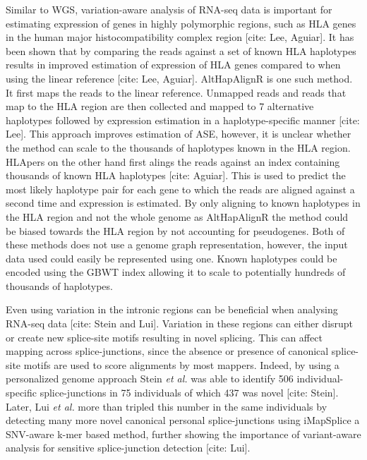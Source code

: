 Similar to WGS, variation-aware analysis of RNA-seq data is important for estimating expression of genes in highly polymorphic regions, such as HLA genes in the human major histocompatibility complex region [cite: Lee, Aguiar]. 
It has been shown that by comparing the reads against a set of known HLA haplotypes results in improved estimation of expression of HLA genes compared to when using the linear reference [cite: Lee, Aguiar].
AltHapAlignR is one such method. It first maps the reads to the linear reference. Unmapped reads and reads that map to the HLA region are then collected and mapped to 7 alternative haplotypes followed by expression estimation in a haplotype-specific manner [cite: Lee]. 
This approach improves estimation of ASE, however, it is unclear whether the method can scale to the thousands of haplotypes known in the HLA region.
HLApers on the other hand first alings the reads against an index containing thousands of known HLA haplotypes [cite: Aguiar]. 
This is used to predict the most likely haplotype pair for each gene to which the reads are aligned against a second time and expression is estimated. 
By only aligning to known haplotypes in the HLA region and not the whole genome as AltHapAlignR the method could be biased towards the HLA region by not accounting for pseudogenes.
Both of these methods does not use a genome graph representation, however, the input data used could easily be represented using one.
Known haplotypes could be encoded using the GBWT index allowing it to scale to potentially hundreds of thousands of haplotypes. 

Even using variation in the intronic regions can be beneficial when analysing RNA-seq data [cite: Stein and Lui]. 
Variation in these regions can either disrupt or create new splice-site motifs resulting in novel splicing. 
This can affect mapping across splice-junctions, since the absence or presence of canonical splice-site motifs are used to score alignments by most mappers. 
Indeed, by using a personalized genome approach Stein \textit{et al.} was able to identify 506 individual-specific splice-junctions in 75 individuals of which 437 was novel [cite: Stein]. 
Later, Lui \textit{et al.} more than tripled this number in the same individuals by detecting many more novel canonical personal splice-junctions using iMapSplice a SNV-aware k-mer based method, further showing the importance of variant-aware analysis for sensitive splice-junction detection [cite: Lui]. 


